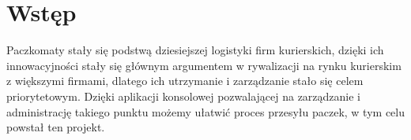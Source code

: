 \section*{Wstęp}

Paczkomaty stały się podstwą dziesiejszej logistyki firm kurierskich, dzięki ich innowacyjności stały się głównym argumentem w rywalizacji na rynku kurierskim z większymi firmami, dlatego ich utrzymanie i zarządzanie stało się celem priorytetowym. Dzięki aplikacji konsolowej pozwalającej na zarządzanie i administrację takiego punktu możemy ułatwić proces przesyłu paczek, w tym celu powstał ten projekt.